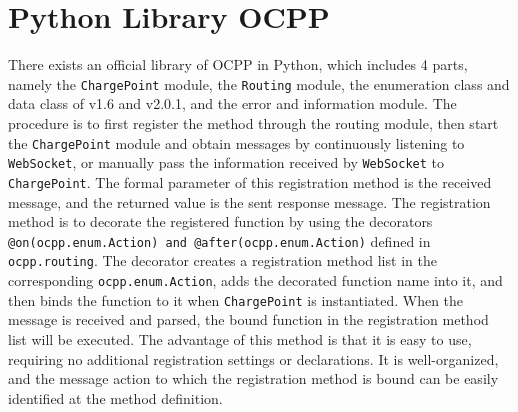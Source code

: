 \documentclass[
english,
ruledheaders=section,%
class=report,%
thesis={type=Report},%
accentcolor=9c,%
custommargins=true,%
marginpar=false,%
parskip=half-,%
fontsize=11pt,%
logofile={img/tuda_logo.pdf}, %
]{tudapub}
\begin{document}




    \section{Python Library OCPP}
    \label{sec:ocppLib}

    There exists an official library of OCPP in Python, which includes 4 parts, namely the \texttt{ChargePoint} module, the \texttt{Routing} module, the enumeration class and data class of v1.6 and v2.0.1, and the error and information module. The procedure is to first register the method through the routing module, then start the \texttt{ChargePoint} module and obtain messages by continuously listening to \texttt{WebSocket}, or manually pass the information received by \texttt{WebSocket} to \texttt{ChargePoint}. The formal parameter of this registration method is the received message, and the returned value is the sent response message. The registration method is to decorate the registered function by using the decorators \texttt{@on(ocpp.enum.Action) and @after(ocpp.enum.Action)} defined in \texttt{ocpp.routing}. The decorator creates a registration method list in the corresponding \texttt{ocpp.enum.Action}, adds the decorated function name into it, and then binds the function to it when \texttt{ChargePoint} is instantiated. When the message is received and parsed, the bound function in the registration method list will be executed.
    The advantage of this method is that it is easy to use, requiring no additional registration settings or declarations. It is well-organized, and the message action to which the registration method is bound can be easily identified at the method definition.
\end{document}
